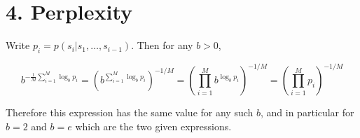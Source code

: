 \documentclass{article}
\begin{document}
\section*{4. Perplexity}

Write $p_i = p(s_i|s_1,\ldots,s_{i-1})$. Then for any $b > 0$,

$$b^{-\frac{1}{M}\sum_{i=1}^M \log_b p_i} = (b^{\sum_{i=1}^M \log_b p_i})^{-1/M} = (\prod_{i=1}^M b^{\log_b p_i})^{-1/M} = (\prod_{i=1}^M p_i)^{-1/M}$$

Therefore this expression has the same value for any such $b$, and in particular for $b=2$ and $b=e$ which are the two given expressions.
\end{document}
